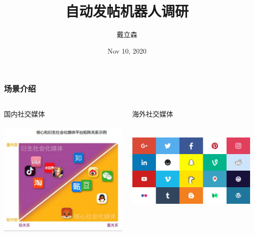 \documentclass[10pt]{beamer}
\title{
    {自动发帖机器人调研}
}
\author{戴立森}
\date{Nov 10, 2020}
\begin{document}
    \maketitle
    \begin{frame}
        \frametitle{场景介绍}
        \begin{columns}
            \begin{column}{.4\linewidth}
                国内社交媒体 \\
                \hspace*{\fill} \\
                \includegraphics[scale=0.2]{src/img/Social_media_mainland.png}

            \end{column}
            \begin{column}{.4\linewidth}
                海外社交媒体 \\
                \hspace*{\fill} \\
                \hspace*{\fill} \\
                \includegraphics[scale=0.07]{src/img/Social_media_oversea.jpg}

            \end{column}
        \end{columns}
    \end{frame}
\end{document}
